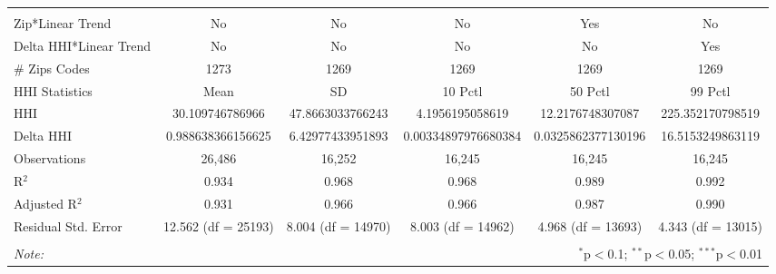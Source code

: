 \begin{table}[H]
{\begin{tabular}{@{\extracolsep{5pt}}lccccc}
 \hline \\[-1.8ex]  

 Zip*Linear Trend & No & No & No & Yes & No \\  

 Delta HHI*Linear Trend & No & No & No & No & Yes \\  

 # Zips Codes & 1273 & 1269 & 1269 & 1269 & 1269 \\  

 HHI Statistics & Mean & SD & 10 Pctl & 50 Pctl & 99 Pctl \\  

 HHI & 30.109746786966 & 47.8663033766243 & 4.1956195058619 & 12.2176748307087 & 225.352170798519 \\  

 Delta HHI & 0.988638366156625 & 6.42977433951893 & 0.00334897976680384 & 0.0325862377130196 & 16.5153249863119 \\  

 Observations & 26,486 & 16,252 & 16,245 & 16,245 & 16,245 \\  

 R$^{2}$ & 0.934 & 0.968 & 0.968 & 0.989 & 0.992 \\  

 Adjusted R$^{2}$ & 0.931 & 0.966 & 0.966 & 0.987 & 0.990 \\  

 Residual Std. Error & 12.562 (df = 25193) & 8.004 (df = 14970) & 8.003 (df = 14962) & 4.968 (df = 13693) & 4.343 (df = 13015) \\  

 \hline  

 \hline \\[-1.8ex]  

 \textit{Note:}  & \multicolumn{5}{r}{$^{*}$p$<$0.1; $^{**}$p$<$0.05; $^{***}$p$<$0.01} \\  

 \end{tabular}}  

 \end{table}  

 



